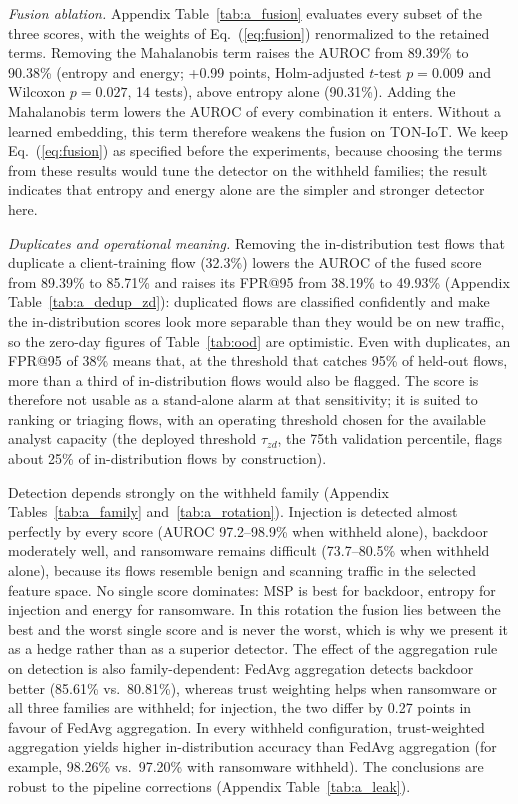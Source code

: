 \documentclass[pdflatex,sn-mathphys-num]{sn-jnl}
\newcommand{\Rtwo}{\color{blue}}
\begin{document}
{{{\Rtwo \emph{Fusion ablation.} Appendix Table~\ref{tab:a_fusion} evaluates every subset of the three scores, with the weights of Eq.~(\ref{eq:fusion}) renormalized to the retained terms. Removing the Mahalanobis term raises the AUROC from 89.39\% to 90.38\% (entropy and energy; +0.99 points, Holm-adjusted $t$-test $p=0.009$ and Wilcoxon $p=0.027$, 14 tests), above entropy alone (90.31\%). Adding the Mahalanobis term lowers the AUROC of every combination it enters. Without a learned embedding, this term therefore weakens the fusion on TON-IoT. We keep Eq.~(\ref{eq:fusion}) as specified before the experiments, because choosing the terms from these results would tune the detector on the withheld families; the result indicates that entropy and energy alone are the simpler and stronger detector here.}

{\Rtwo \emph{Duplicates and operational meaning.} Removing the in-distribution test flows that duplicate a client-training flow (32.3\%) lowers the AUROC of the fused score from 89.39\% to 85.71\% and raises its FPR@95 from 38.19\% to 49.93\% (Appendix Table~\ref{tab:a_dedup_zd}): duplicated flows are classified confidently and make the in-distribution scores look more separable than they would be on new traffic, so the zero-day figures of Table~\ref{tab:ood} are optimistic. Even with duplicates, an FPR@95 of 38\% means that, at the threshold that catches 95\% of held-out flows, more than a third of in-distribution flows would also be flagged. The score is therefore not usable as a stand-alone alarm at that sensitivity; it is suited to ranking or triaging flows, with an operating threshold chosen for the available analyst capacity (the deployed threshold $\tau_{zd}$, the 75th validation percentile, flags about 25\% of in-distribution flows by construction).}

Detection depends strongly on the withheld family (Appendix Tables~\ref{tab:a_family} and~\ref{tab:a_rotation}). Injection is detected almost perfectly by every score (AUROC 97.2--98.9\% when withheld alone), backdoor moderately well, and ransomware remains difficult (73.7--80.5\% when withheld alone), because its flows resemble benign and scanning traffic in the selected feature space. No single score dominates: MSP is best for backdoor, entropy for injection and energy for ransomware. In this rotation the fusion lies between the best and the worst single score and is never the worst, which is why we present it as a hedge rather than as a superior detector. The effect of the aggregation rule on detection is also family-dependent: FedAvg aggregation detects backdoor better (85.61\% vs.\ 80.81\%), whereas trust weighting helps when ransomware or all three families are withheld; for injection, the two differ by 0.27 points in favour of FedAvg aggregation. In every withheld configuration, trust-weighted aggregation yields higher in-distribution accuracy than FedAvg aggregation (for example, 98.26\% vs.\ 97.20\% with ransomware withheld). The conclusions are robust to the pipeline corrections (Appendix Table~\ref{tab:a_leak}).

}}
\end{document}
